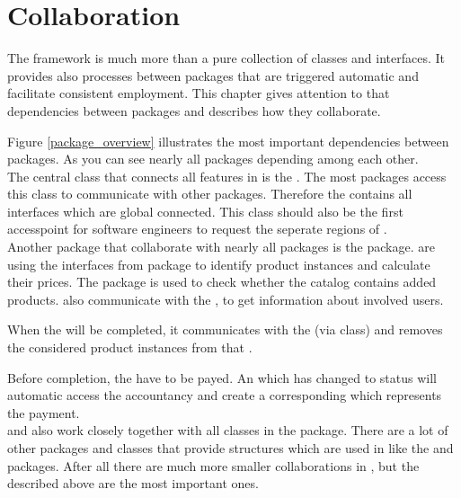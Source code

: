 \chapter{Collaboration}

The \salespoint{} framework is much more than a pure collection of classes and interfaces. It provides also processes between packages that are triggered automatic and facilitate consistent employment. This chapter gives attention to that dependencies between packages and describes how they collaborate.  

Figure \ref{package_overview} illustrates the most important dependencies between \salespoint{} packages. As you can see nearly all packages depending among each other.\\ 

The central class that connects all features in \salespoint{} is the . The most packages access this class to communicate with other packages. Therefore the  contains all interfaces which are global connected. This class should also be the first accesspoint for software engineers to request the seperate regions of \salespoint{}.\\

Another package that collaborate with nearly all packages is the  package.  are using the interfaces from  package to identify product instances and calculate their prices. The  package is used to check whether the catalog contains added products.  also communicate with the , to get information about involved users.\par 
When the  will be completed, it communicates with the  (via  class) and removes the considered product instances from that . \par
Before completion, the  have to be payed. An  which has changed to status  will automatic access the accountancy and create a corresponding  which represents the payment.\\ 

 and  also work closely together with all classes in the  package. There are a lot of other packages and classes that provide structures which are used in \salespoint{} like the  and  packages. After all there are much more smaller collaborations in \salespoint{}, but the described above are the most important ones.




